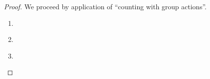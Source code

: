 \documentclass{article}
\begin{document}
\begin{proof}
We proceed by application of ``counting with group actions''.
\begin{enumerate}
  \item{
       }
  \item{
       }
  \item{
       }
\end{enumerate}
\end{proof}
\end{document}
